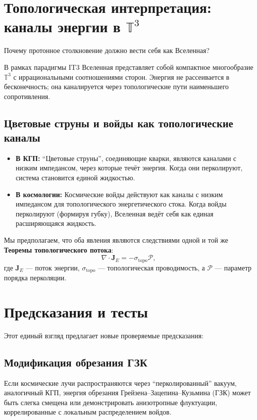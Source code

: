 \documentclass[12pt,a4paper]{article}
\begin{document}
\section{Топологическая интерпретация: каналы энергии в $\mathbb{T}^3$}

Почему протонное столкновение должно вести себя как Вселенная?

В рамках парадигмы IT3 Вселенная представляет собой компактное многообразие $\mathbb{T}^3$ с иррациональными соотношениями сторон. Энергия не рассеивается в бесконечность; она каналируется через топологические пути наименьшего сопротивления.

\subsection{Цветовые струны и войды как топологические каналы}
\begin{itemize}
    \item \textbf{В КГП:} ``Цветовые струны'', соединяющие кварки, являются каналами с низким импедансом, через которые течёт энергия. Когда они перколируют, система становится единой жидкостью.
    \item \textbf{В космологии:} Космические войды действуют как каналы с низким импедансом для топологического энергетического стока. Когда войды перколируют (формируя губку), Вселенная ведёт себя как единая расширяющаяся жидкость.
\end{itemize}

Мы предполагаем, что оба явления являются следствиями одной и той же \textbf{Теоремы топологического потока}:
\begin{equation}
\nabla \cdot \mathbf{J}_E = -\sigma_{\mathrm{topo}} \mathcal{P},
\end{equation}
где $\mathbf{J}_E$ — поток энергии, $\sigma_{\mathrm{topo}}$ — топологическая проводимость, а $\mathcal{P}$ — параметр порядка перколяции.

\section{Предсказания и тесты}

Этот единый взгляд предлагает новые проверяемые предсказания:

\subsection{Модификация обрезания ГЗК}
Если космические лучи распространяются через ``перколированный'' вакуум, аналогичный КГП, энергия обрезания Грейзена–Зацепина–Кузьмина (ГЗК) может быть слегка смещена или демонстрировать анизотропные флуктуации, коррелированные с локальным распределением войдов.
\end{document}
